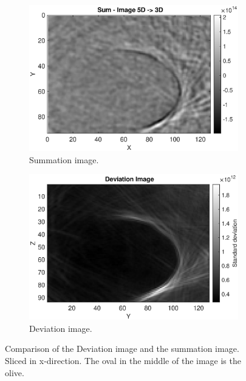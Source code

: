 \begin{figure}[H]
        \centering
    \begin{subfigure}[b]{0.61\textwidth}
         \centering
         \includegraphics[width=1.13\textwidth]{Graphics/Results/Variance_Image/Variance_Ortho_slice_63_x_direkt_compare_5d_to_3d.eps}
         \caption{Summation image. }
         \label{fig:deviation_image_x_slice_normal}
     \end{subfigure}
     \hfill
    \begin{subfigure}[b]{0.61\textwidth}
        \centering
        \includegraphics[width=1.13\textwidth]{Graphics/Results/Variance_Image/Variance_Ortho_slice_x_63.eps}
        \caption{Deviation image.}
        \label{fig:deviation_image_x_slice_deviation}
     \end{subfigure}
        \caption{Comparison of the Deviation image and the summation image. Sliced in x-direction. The oval in the middle of the image is the olive.}
        \label{fig:deviation_image_x_slice}
\end{figure}

